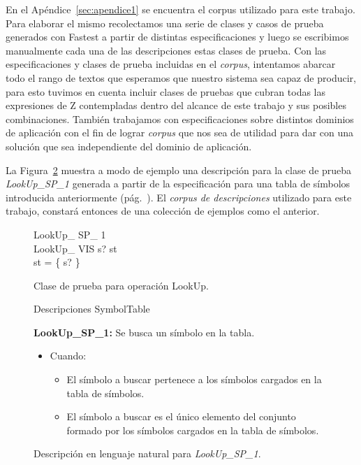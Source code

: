 En el Apéndice~\ref{sec:apendice1} se encuentra el corpus utilizado para este trabajo. Para elaborar el mismo recolectamos una serie de clases y casos de prueba generados con Fastest a partir de distintas especificaciones y luego se escribimos manualmente cada una de las descripciones estas clases de prueba. Con las especificaciones y clases de prueba incluidas en el \emph{corpus}, intentamos abarcar todo el rango de textos que esperamos que nuestro sistema sea capaz de producir, para esto tuvimos en cuenta incluir clases de pruebas que cubran todas las expresiones de Z contempladas dentro del alcance de este trabajo y sus posibles combinaciones. También trabajamos con especificaciones sobre distintos dominios de aplicación con el fin de lograr \emph{corpus} que nos sea de utilidad para dar con una solución que sea independiente del dominio de aplicación.

La Figura~\ref{fig:ej_desc_lookup_sp_1} muestra a modo de ejemplo una descripción para la clase de prueba \emph{LookUp\_SP\_1} generada a partir de la especificación para una tabla de símbolos introducida anteriormente (pág.~\pageref{fig:spec_symbol_table}). 
El \emph{corpus de descripciones} utilizado para este trabajo, constará entonces de una colección de ejemplos como el anterior.


\begin{figure}[H]
  \centering
   \begin{schema}{LookUp\_ SP\_ 1}\\
  		LookUp\_ VIS 
  		\where
  	 	s? \in \dom st \\
 		\dom st = \{ s? \}
  	\end{schema}
  \caption{Clase de prueba para operación LookUp.}
  \label{fig:ej_lookup_sp_1}
\end{figure}

\begin{figure}[H]
Descripciones SymbolTable 

\bigskip
\textbf{LookUp\_SP\_1:} Se busca un símbolo en la tabla.  
  \begin{itemize}
   \item{Cuando:}
   \begin{itemize}
  	  \item{El símbolo a buscar pertenece a los símbolos cargados en la tabla de símbolos.}
  	  \item{El símbolo a buscar es el único elemento del conjunto formado por los símbolos cargados en la tabla de símbolos.}   
   \end{itemize}
  \end{itemize}
  \caption{Descripción en lenguaje natural para \emph{LookUp\_SP\_1}.}
  \label{fig:ej_desc_lookup_sp_1}
\end{figure}
